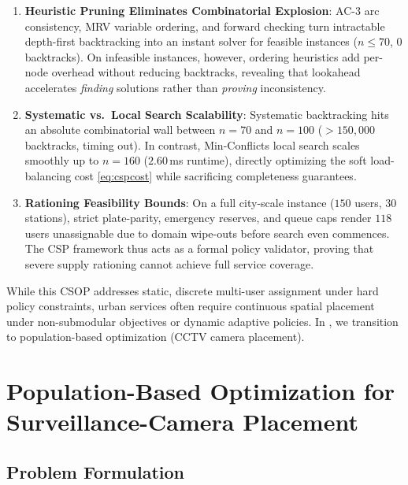 \documentclass{ai-lab-report}
\begin{document}
\begin{enumerate}
  \item \textbf{Heuristic Pruning Eliminates Combinatorial Explosion}: AC-3 arc consistency, MRV variable ordering, and forward checking turn intractable depth-first backtracking into an instant solver for feasible instances ($n\le70$, 0 backtracks). On infeasible instances, however, ordering heuristics add per-node overhead without reducing backtracks, revealing that lookahead accelerates \emph{finding} solutions rather than \emph{proving} inconsistency.
  \item \textbf{Systematic vs.\ Local Search Scalability}: Systematic backtracking hits an absolute combinatorial wall between $n=70$ and $n=100$ ($>150{,}000$ backtracks, timing out). In contrast, Min-Conflicts local search scales smoothly up to $n=160$ ($2.60$\,ms runtime), directly optimizing the soft load-balancing cost \cref{eq:cspcost} while sacrificing completeness guarantees.
  \item \textbf{Rationing Feasibility Bounds}: On a full city-scale instance ($150$ users, $30$ stations), strict plate-parity, emergency reserves, and queue caps render $118$ users unassignable due to domain wipe-outs before search even commences. The CSP framework thus acts as a formal policy validator, proving that severe supply rationing cannot achieve full service coverage.
\end{enumerate}

While this CSOP addresses static, discrete multi-user assignment under hard policy constraints, urban services often require 
continuous spatial placement under non-submodular objectives or dynamic adaptive policies. In , we transition 
to population-based optimization (CCTV camera placement).

\section{Population-Based Optimization for Surveillance-Camera Placement}
\label{sec:a3}\label{sec:swarm}

\subsection{Problem Formulation}
\label{subsec:a3cctv}
\end{document}
